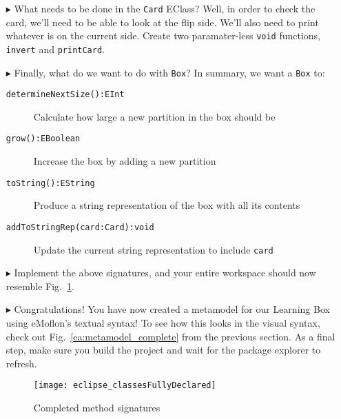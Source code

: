 \begin{itemize}
\vspace{0.5cm}

\item[$\blacktriangleright$] What needs to be done in the \texttt{Card} EClass? Well, in order to check the card, we'll need to be able to look at the flip
side. We'll also need to print whatever is on the current side. Create two paramater-less \texttt{void} functions, \texttt{invert} and \texttt{printCard}. 

\item[$\blacktriangleright$] Finally, what do we want to do with \texttt{Box}? In summary, we want a \texttt{Box} to:

\begin{description}
  \item[\texttt{determineNextSize():EInt}] Calculate how large a new partition in the box should be
  \item[\texttt{grow():EBoolean}] Increase the box by adding a new partition
  \item[\texttt{toString():EString}] Produce a string representation of the box with all its contents
  \item[\texttt{addToStringRep(card:Card):void}] Update the current string representation to include \texttt{card}
\end{description}

\item[$\blacktriangleright$] Implement the above signatures, and your entire workspace should now resemble Fig.~\ref{eclipse:workspaceMethods}.

\item[$\blacktriangleright$] Congratulations! You have now created a metamodel for our Learning Box using eMoflon's textual syntax! To see how
this looks in the visual syntax, check out Fig.~\ref{ea:metamodel_complete} from the previous section. As a final step, make sure you build the project and
wait for the package explorer to refresh. 

\newpage


\begin{figure}[htbp]
	\centering
  \texttt{[image: eclipse\_classesFullyDeclared]}
	\caption{Completed method signatures}
	\label{eclipse:workspaceMethods}
\end{figure}
\FloatBarrier

\end{itemize}